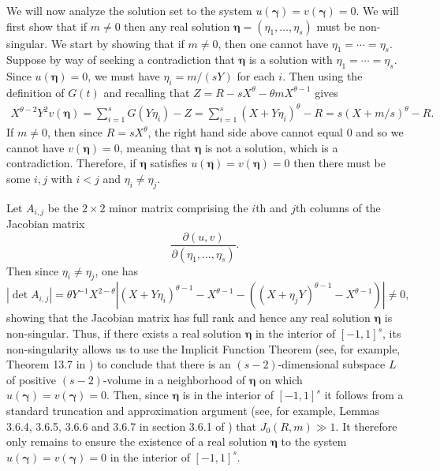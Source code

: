 \documentclass[11pt,reqno]{amsart}
\numberwithin{equation}{section}
\begin{document}
We will now analyze the solution set to the system $u(\boldsymbol{\gamma}) = v(\boldsymbol{\gamma}) = 0$. We will first show that if $m \neq 0$ then any real solution $\boldsymbol{\eta} = (\eta_1,\ldots,\eta_s)$ must be non-singular. 
We start by showing that if $m \neq 0$, then one cannot have $\eta_1 = \cdots = \eta_s$. 
Suppose by way of seeking a contradiction that $\boldsymbol{\eta}$ is a solution with $\eta_1 = \cdots = \eta_s$. Since $u(\boldsymbol{\eta}) = 0$, we must have $\eta_i = m/(sY)$ for each $i$. Then using the definition of $G(t)$ and recalling that $Z = R-sX^{\theta}-\theta m X^{\theta-1}$ gives
\begin{align*} X^{\theta-2}Y^2v(\boldsymbol{\eta}) = \sum_{i=1}^s G(Y\eta_i) - Z = \sum_{i=1}^s (X+Y\eta_i)^{\theta}-R = s(X+m/s)^{\theta}-R. 
\end{align*}
If $m \neq 0$, then since $R = sX^{\theta}$, the right hand side above cannot equal $0$ and so we cannot have $v(\boldsymbol{\eta}) = 0$, meaning that $\boldsymbol{\eta}$ is not a solution, which is a contradiction. 
Therefore, if $\boldsymbol{\eta}$ satisfies $u(\boldsymbol{\eta})=v(\boldsymbol{\eta}) = 0$ then there must be some $i,j $ with $i < j$ and $\eta_i \neq \eta_j$. 

Let $A_{i,j}$ be the $2 \times 2$ minor matrix comprising the $i$th and $j$th columns of the Jacobian matrix 
\[ \frac{\partial(u,v)}{\partial(\eta_1,\ldots,\eta_s)}. \]
Then since $\eta_i \neq \eta_j$, one has 
\[ |\det{A_{i,j}}| = \theta Y^{-1}X^{2-\theta}|(X+Y\eta_i)^{\theta-1}-X^{\theta-1}-((X+\eta_jY)^{\theta-1}-X^{\theta-1}) | \neq 0, \]
showing that the Jacobian matrix has full rank and hence any real solution $\boldsymbol{\eta}$ is non-singular. Thus, if there exists a real solution $\boldsymbol{\eta}$ in the interior of $[-1,1]^s$, its non-singularity allows us to use the Implicit Function Theorem (see, for example, Theorem 13.7 in \cite{Apo}) to conclude that there is an $(s-2)$-dimensional subspace $L$ of positive $(s-2)$-volume in a neighborhood of $\boldsymbol{\eta}$ on which $u(\boldsymbol{\gamma})=v(\boldsymbol{\gamma}) = 0$. Then, since $\boldsymbol{\eta}$ is in the interior of $[-1,1]^s$ it follows from a standard truncation and approximation argument (see, for example, Lemmas 3.6.4, 3.6.5, 3.6.6 and 3.6.7 in section 3.6.1 of \cite{Poulthesis}) that $J_0(R,m) \gg 1$. It therefore only remains to ensure the existence of a real solution $\boldsymbol{\eta}$ to the system $u(\boldsymbol{\gamma}) = v(\boldsymbol{\gamma}) = 0$ in the interior of $[-1,1]^s$. 
\end{document}

